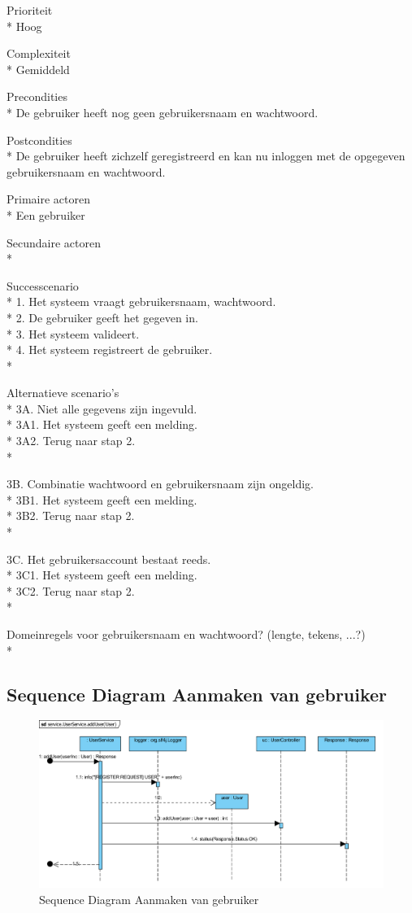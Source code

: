 \documentclass[pdftex,a4paper,12pt,twoside]{report}
\begin{document}
Prioriteit\\*
Hoog

Complexiteit\\*
Gemiddeld

Precondities \\*
De gebruiker heeft nog geen gebruikersnaam en wachtwoord.

Postcondities \\*
De gebruiker heeft zichzelf geregistreerd en kan nu inloggen met de opgegeven gebruikersnaam en wachtwoord.

Primaire actoren \\*
Een gebruiker

Secundaire actoren \\*

Successcenario\\*
1.	Het systeem vraagt gebruikersnaam, wachtwoord.\\*
2.	De gebruiker geeft het gegeven in.\\*
3.	Het systeem valideert.\\*
4.	Het systeem registreert de gebruiker.\\*

Alternatieve scenario’s\\*
3A. Niet alle gegevens zijn ingevuld.\\*
3A1. Het systeem geeft een melding.\\*
3A2. Terug naar stap 2.\\*

3B. Combinatie wachtwoord en gebruikersnaam zijn ongeldig.\\*
3B1. Het systeem geeft een melding.\\*
3B2. Terug naar stap 2.\\*

3C. Het gebruikersaccount bestaat reeds.\\*
3C1. Het systeem geeft een melding.\\*
3C2. Terug naar stap 2.\\*


Domeinregels voor gebruikersnaam en wachtwoord? (lengte, tekens, ...?)\\*
\subsection{Sequence Diagram Aanmaken van gebruiker}
\begin{figure}[!htb]
\includegraphics[width=\textwidth]{images/aanmakenuser.png}
\caption{Sequence Diagram Aanmaken van gebruiker}
\end{figure}
\end{document}
